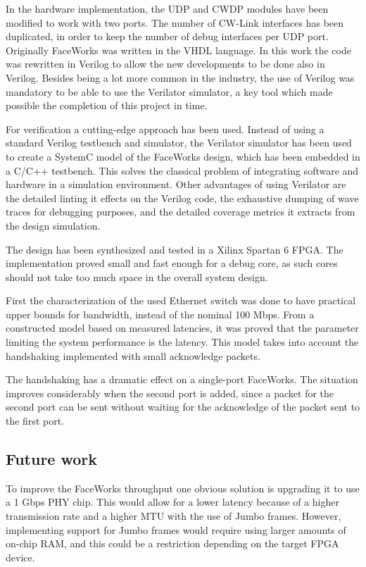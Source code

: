 \documentclass[conference]{IEEEtran}
\begin{document}
In the hardware implementation, the UDP and CWDP modules have been modified to work with two ports. The number of CW-Link interfaces has been duplicated, in order to keep the number of debug interfaces per UDP port. Originally FaceWorks was written in the VHDL language. In this work the code was rewritten in Verilog to allow the new developments to be done also in Verilog. Besides being a lot more common in the industry, the use of Verilog was mandatory to be able to use the Verilator simulator, a key tool which made possible the completion of this project in time.

For verification a cutting-edge approach has been used. Instead of using a standard Verilog testbench and simulator, the Verilator simulator has been used to create a SystemC model of the FaceWorks design, which has been embedded in a C/C++ testbench. This solves the classical problem of integrating software and hardware in a simulation environment. Other advantages of using Verilator are the detailed linting it effects on the Verilog code, the exhaustive dumping of wave traces for debugging purposes, and the detailed coverage metrics it extracts from the design simulation. 

The design has been synthesized and tested in a Xilinx Spartan 6 FPGA. The implementation proved small and fast enough for a debug core, as such cores should not take too much space in the overall system design.

First the characterization of the used Ethernet switch was done to have practical upper bounds for bandwidth, instead of the nominal 100 Mbps. From a constructed model based on measured latencies, it was proved that the parameter limiting the system performance is the latency. This model takes into account the handshaking implemented with small acknowledge packets.

The handshaking has a dramatic effect on a single-port FaceWorks. The situation improves considerably when the second port is added, since a packet for the second port can be sent without waiting for the acknowledge of the packet sent to the first port.

\subsection{Future work}

To improve the FaceWorks throughput one obvious solution is upgrading it to use a 1 Gbps PHY chip. This would allow for a lower latency because of a higher transmission rate and a higher MTU with the use of Jumbo frames. However, implementing support for Jumbo frames would require using larger amounts of on-chip RAM, and this could be a restriction depending on the target FPGA device.
\end{document}
